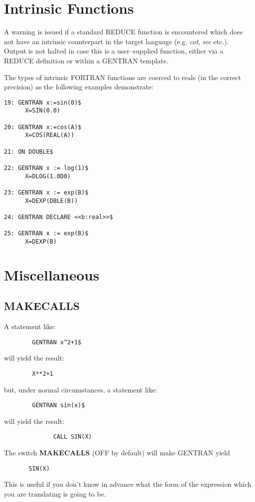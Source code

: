 \section{Intrinsic Functions}
\label{intrinsic}
A warning is issued if a standard REDUCE function is encountered which
does not have an intrinsic counterpart in the target language (e.g. {\it cot\/},
{\it sec\/} etc.).
Output is not halted in case this is a user--supplied function, either via
a REDUCE definition or within a GENTRAN template.

The types of intrinsic FORTRAN functions are coerced to reals (in the correct
precision) as the following examples demonstrate:
\begin{verbatim}
19: GENTRAN x:=sin(0)$
      X=SIN(0.0)

20: GENTRAN x:=cos(A)$
      X=COS(REAL(A))

21: ON DOUBLE$

22: GENTRAN x := log(1)$
      X=DLOG(1.0D0)

23: GENTRAN x := exp(B)$
      X=DEXP(DBLE(B))

24: GENTRAN DECLARE <<b:real>>$

25: GENTRAN x := exp(B)$
      X=DEXP(B)

\end{verbatim}

\section{Miscellaneous}

\subsection{MAKECALLS}
A statement like:
\begin{verbatim}
        GENTRAN x^2+1$
\end{verbatim}
will yield the result:
\begin{verbatim}
        X**2+1
\end{verbatim}
but, under normal circumstances, a statement like:
\begin{verbatim}
        GENTRAN sin(x)$
\end{verbatim}
will yield the result:
\begin{verbatim}
              CALL SIN(X)
\end{verbatim}  
The switch {\bf MAKECALLS} (OFF by default) will make GENTRAN yield
\begin{verbatim}
       SIN(X)
\end{verbatim}
This is useful if you don't know in advance what the form of the expression
which you are translating is going to be.

